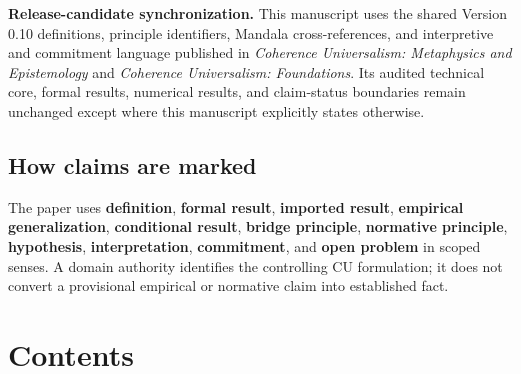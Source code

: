 \documentclass[
  11pt,
]{article}
\begin{document}
\textbf{Release-candidate synchronization.} This manuscript uses the
shared Version 0.10 definitions, principle identifiers, Mandala
cross-references, and interpretive and commitment language published in
\emph{Coherence Universalism: Metaphysics and Epistemology} and
\emph{Coherence Universalism: Foundations}. Its audited technical core,
formal results, numerical results, and claim-status boundaries remain
unchanged except where this manuscript explicitly states otherwise.

\subsection{How claims are marked}\label{how-claims-are-marked}

The paper uses \textbf{definition}, \textbf{formal result},
\textbf{imported result}, \textbf{empirical generalization},
\textbf{conditional result}, \textbf{bridge principle},
\textbf{normative principle}, \textbf{hypothesis},
\textbf{interpretation}, \textbf{commitment}, and \textbf{open problem}
in scoped senses. A domain authority identifies the controlling CU
formulation; it does not convert a provisional empirical or normative
claim into established fact.

\section{Contents}\label{contents}
\end{document}
